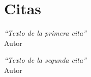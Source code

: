 \chapter*{Citas}
\vspace*{\fill}
\begin{flushright}
	\emph{``Texto de la primera cita''}\\[0.5em]
	Autor
\end{flushright}
\vspace*{\fill}
\begin{flushright}
	\emph{``Texto de la segunda cita''}\\[0.5em]
	Autor
\end{flushright}
\vspace*{\fill}
